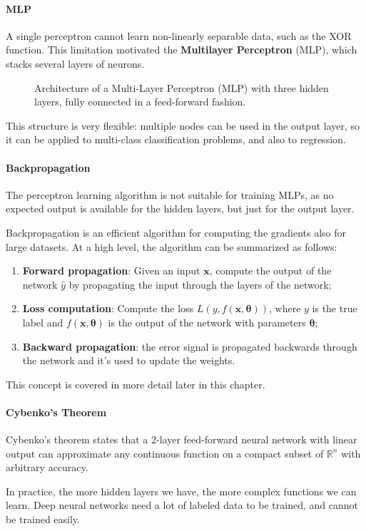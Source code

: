 \paragraph{MLP}
A single perceptron cannot learn non-linearly separable data, such as the XOR function. This limitation motivated the
\textbf{Multilayer Perceptron} (MLP), which stacks several layers of neurons.
\begin{figure}[H]
    \centering
    \scalebox{0.8}{
        
    }
    \caption{Architecture of a Multi-Layer Perceptron (MLP) with three hidden layers, fully connected in a feed-forward fashion.}
    \label{fig:mlp}
\end{figure}
This structure is very flexible: multiple nodes can be used in the output layer, so it can be applied to multi-class classification problems, and also to regression.

\paragraph{Backpropagation}
\label{introduction-backpropagation}
The perceptron learning algorithm is not suitable for training MLPs, as no expected output is available for the hidden layers, but just for the output layer.

Backpropagation is an efficient algorithm for computing the gradients also for large datasets.
At a high level, the algorithm can be summarized as follows:
\begin{enumerate}
    \item \textbf{Forward propagation}: Given an input $\boldsymbol{x}$, compute the output of the network $\hat{y}$ by
    propagating the input through the layers of the network;
    \item \textbf{Loss computation}: Compute the loss $L(y, f(\boldsymbol{x}, \boldsymbol{\theta}))$, where $y$ is the true label and $f(\boldsymbol{x}, \boldsymbol{\theta})$ is the output of the network with parameters $\boldsymbol{\theta}$;
    \item \textbf{Backward propagation}: the error signal is propagated backwards through the network and it's used to update the weights.
\end{enumerate}
This concept is covered in more detail later in this chapter.

\paragraph{Cybenko's Theorem}
Cybenko's theorem states that a 2-layer feed-forward neural network with linear output
can approximate any continuous function on a compact subset of $\mathbb{R}^n$ with arbitrary accuracy.

In practice, the more hidden layers we have, the more complex functions we can learn. Deep
neural networks need a lot of labeled data to be trained, and cannot be trained easily.
